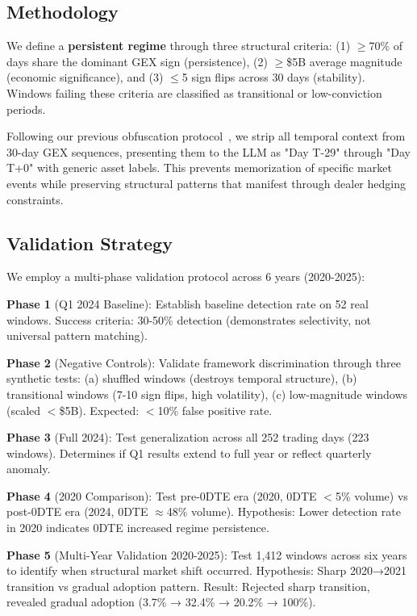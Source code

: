 \subsection{Methodology}

We define a \textbf{persistent regime} through three structural criteria: (1) $\geq$70\% of days share the dominant GEX sign (persistence), (2) $\geq$\$5B average magnitude (economic significance), and (3) $\leq$5 sign flips across 30 days (stability). Windows failing these criteria are classified as transitional or low-conviction periods.

Following our previous obfuscation protocol~\citep{regan2025obfuscation}, we strip all temporal context from 30-day GEX sequences, presenting them to the LLM as "Day T-29" through "Day T+0" with generic asset labels. This prevents memorization of specific market events while preserving structural patterns that manifest through dealer hedging constraints.

\subsection{Validation Strategy}

We employ a multi-phase validation protocol across 6 years (2020-2025):

\textbf{Phase 1} (Q1 2024 Baseline): Establish baseline detection rate on 52 real windows. Success criteria: 30-50\% detection (demonstrates selectivity, not universal pattern matching).

\textbf{Phase 2} (Negative Controls): Validate framework discrimination through three synthetic tests: (a) shuffled windows (destroys temporal structure), (b) transitional windows (7-10 sign flips, high volatility), (c) low-magnitude windows (scaled $<$\$5B). Expected: $<$10\% false positive rate.

\textbf{Phase 3} (Full 2024): Test generalization across all 252 trading days (223 windows). Determines if Q1 results extend to full year or reflect quarterly anomaly.

\textbf{Phase 4} (2020 Comparison): Test pre-0DTE era (2020, 0DTE $<$5\% volume) vs post-0DTE era (2024, 0DTE $\approx$48\% volume). Hypothesis: Lower detection rate in 2020 indicates 0DTE increased regime persistence.

\textbf{Phase 5} (Multi-Year Validation 2020-2025): Test 1,412 windows across six years to identify when structural market shift occurred. Hypothesis: Sharp 2020→2021 transition vs gradual adoption pattern. Result: Rejected sharp transition, revealed gradual adoption (3.7\% → 32.4\% → 20.2\% → 100\%).

